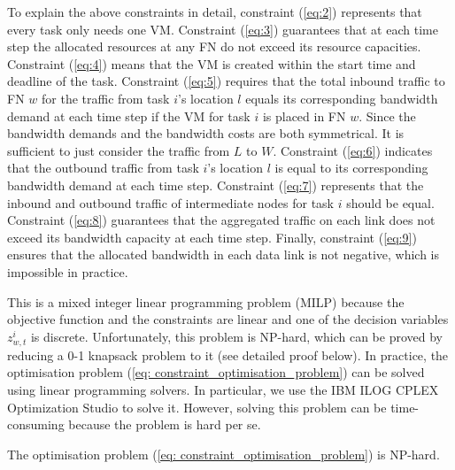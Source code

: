 \documentclass[11pt]{phdthesis}
\begin{document}
\normalsize
To explain the above constraints in detail, constraint (\ref{eq:2}) represents that every task only needs one VM. Constraint (\ref{eq:3}) guarantees that at each time step the allocated resources at any FN do not exceed its resource capacities. Constraint (\ref{eq:4}) means that the VM is created within the start time and deadline of the task. Constraint (\ref{eq:5}) requires that the total inbound traffic to FN $w$ for the traffic from task $i$'s location $l$ equals its corresponding bandwidth demand at each time step if the VM for task $i$ is placed in FN $w$. 
Since the bandwidth demands and the bandwidth costs are both symmetrical. It is sufficient to just consider the traffic from $ L $ to $ W $. Constraint (\ref{eq:6}) indicates that the outbound traffic from task $i$'s location $l$ is equal to its corresponding bandwidth demand at each time step. Constraint (\ref{eq:7}) represents that the inbound and outbound traffic of intermediate nodes for task $ i $ should be equal. Constraint (\ref{eq:8}) guarantees that the aggregated traffic on each link does not exceed its bandwidth capacity at each time step. Finally, constraint (\ref{eq:9}) ensures that the allocated bandwidth in each data link is not negative, which is impossible in practice. 

This is a mixed integer linear programming problem (MILP) because the objective function and the constraints are linear and one of the decision variables $ z_{w,t} ^i $ is discrete. Unfortunately, this problem is NP-hard, which can be proved by reducing a 0-1 knapsack problem to it (see detailed proof below). In practice, the optimisation problem (\ref{eq: constraint_optimisation_problem}) can be solved using linear programming solvers. In particular, we use the IBM ILOG CPLEX Optimization Studio to solve it. However, solving this problem can be time-consuming because the problem is hard per se.

\begin{theorem} \label{th: NP-hardness}
    The optimisation problem (\ref{eq: constraint_optimisation_problem}) is NP-hard.
\end{theorem}
\end{document}
